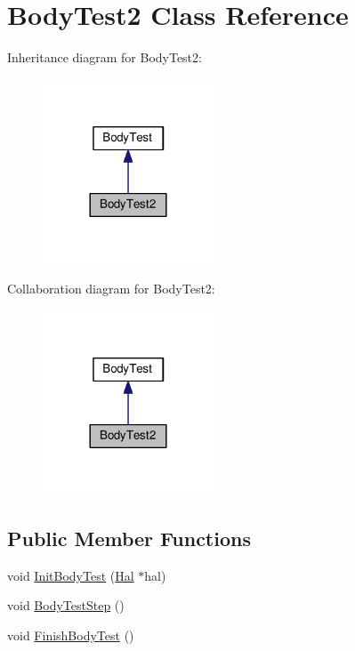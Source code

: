 \hypertarget{class_body_test2}{}\section{Body\+Test2 Class Reference}
\label{class_body_test2}


Inheritance diagram for Body\+Test2\+:
\nopagebreak
\begin{figure}[H]
\begin{center}
\leavevmode
\includegraphics[width=144pt]{class_body_test2__inherit__graph}
\end{center}
\end{figure}


Collaboration diagram for Body\+Test2\+:
\nopagebreak
\begin{figure}[H]
\begin{center}
\leavevmode
\includegraphics[width=144pt]{class_body_test2__coll__graph}
\end{center}
\end{figure}
\subsection*{Public Member Functions}
\begin{DoxyCompactItemize}
\item 
void \hyperlink{class_body_test2_ab496f4a4caecc90776893cb2729b8ef4}{Init\+Body\+Test} (\hyperlink{class_hal}{Hal} $\ast$hal)
\item 
void \hyperlink{class_body_test2_a4a126925f033e1147f404c7281715bb1}{Body\+Test\+Step} ()
\item 
void \hyperlink{class_body_test2_a9a0caae0a949e02e489b8d2eb2ad81d5}{Finish\+Body\+Test} ()
\end{DoxyCompactItemize}


